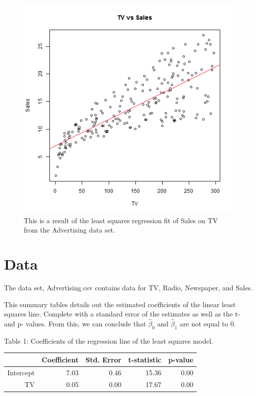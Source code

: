\documentclass{article}
\begin{document}
\begin{figure}
\centering
\includegraphics{scatterplot-tv-sales.png}
\caption{This is a result of the least squares regression fit of Sales on TV from the Advertising data set.}
\end{figure}


\section{Data}

The data set, Advertising.csv contains data for TV, Radio, Newspaper, and Sales. 

This summary tables details out the estimated coefficients of the linear least squares line. Complete with a standard error of the estimates as well as the t- and p- values. From this, we can conclude that $\hat \beta_0$ and $\hat \beta_1$ are not equal to 0. 


\begin{center}

Table 1: Coefficients of the regression line of the least squares model.
\end{center}


\begin{table}[ht]
\centering
\begin{tabular}{rrrrr}
  \hline
 & Coefficient & Std. Error & t-statistic & p-value \\ 
  \hline
Intercept & 7.03 & 0.46 & 15.36 & 0.00 \\ 
  TV & 0.05 & 0.00 & 17.67 & 0.00 \\ 
   \hline
\end{tabular}
\end{table}
\end{document}
